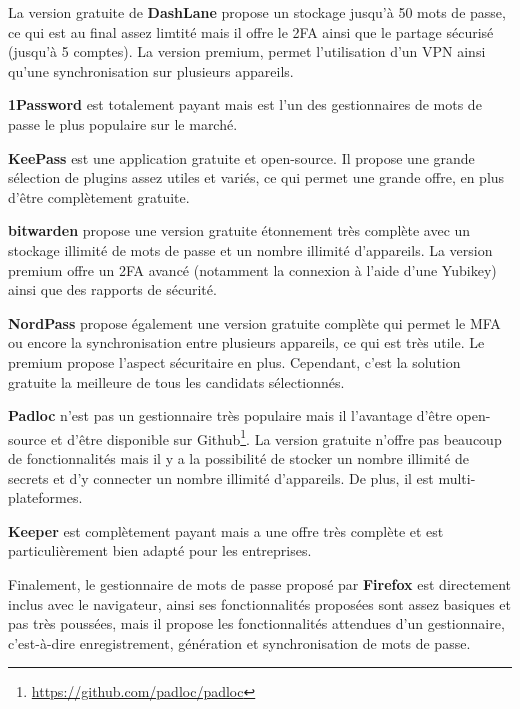 La version gratuite de \textbf{DashLane} propose un stockage jusqu'à 50 mots de passe, ce qui est au final assez limtité mais il offre le 2FA ainsi que le partage sécurisé (jusqu'à 5 comptes). La version premium, permet l'utilisation d'un VPN ainsi qu'une synchronisation sur plusieurs appareils.

\textbf{1Password} est totalement payant mais est l'un des gestionnaires de mots de passe le plus populaire sur le marché.

\textbf{KeePass} est une application gratuite et open-source. Il propose une grande sélection de plugins assez utiles et variés, ce qui permet une grande offre, en plus d'être complètement gratuite.

\textbf{bitwarden} propose une version gratuite étonnement très complète avec un stockage illimité de mots de passe et un nombre illimité d'appareils. La version premium offre un 2FA avancé (notamment la connexion à l'aide d'une Yubikey) ainsi que des rapports de sécurité.

\textbf{NordPass} propose également une version gratuite complète qui permet le MFA ou encore la synchronisation entre plusieurs appareils, ce qui est très utile. Le premium propose l'aspect sécuritaire en plus. Cependant, c'est la solution gratuite la meilleure de tous les candidats sélectionnés.

\textbf{Padloc} n'est pas un gestionnaire très populaire mais il l'avantage d'être open-source et d'être disponible sur Github\footnote{\href{https://github.com/padloc/padloc}{https://github.com/padloc/padloc}}. La version gratuite n'offre pas beaucoup de fonctionnalités mais il y a la possibilité de stocker un nombre illimité de secrets et d'y connecter un nombre illimité d'appareils. De plus, il est multi-plateformes.

\textbf{Keeper} est complètement payant mais a une offre très complète et est particulièrement bien adapté pour les entreprises.

Finalement, le gestionnaire de mots de passe proposé par \textbf{Firefox} est directement inclus avec le navigateur, ainsi ses fonctionnalités proposées sont assez basiques et pas très poussées, mais il propose les fonctionnalités attendues d'un gestionnaire, c'est-à-dire enregistrement, génération et synchronisation de mots de passe.
